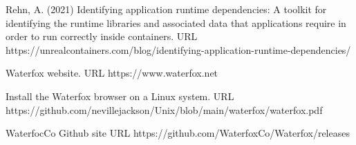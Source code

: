 \documentclass{article}  %
\begin{document}
\begin{thebibliography}{99}
Rehn, A. (2021)
Identifying application runtime dependencies: A toolkit for identifying the runtime libraries and associated data that applications require in order to run correctly inside containers. 
URL https://unrealcontainers.com/blog/identifying-application-runtime-dependencies/

Waterfox website. URL https://www.waterfox.net

Install the Waterfox browser on a Linux system. URL https://github.com/nevillejackson/Unix/blob/main/waterfox/waterfox.pdf

WaterfocCo Github site URL https://github.com/WaterfoxCo/Waterfox/releases

\end{thebibliography}
\end{document}
